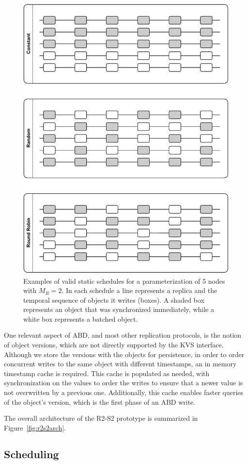 \begin{figure}[ht!]
    \centering
    \includegraphics[width=0.75\linewidth]{img/schedules}
    \caption{Examples of valid static schedules for a
    parameterization of 5 nodes with $M_R = 2$. In each
    schedule a line represents a replica and the temporal sequence of
    objects it writes (boxes). A shaded box represents an object
    that was synchronized immediately, while a white box
    represents a batched object.}\label{fig:schedules}
\end{figure}
One relevant aspect of \ac{ABD}, and most other replication
protocols, is the notion of object versions, which are not directly supported by the
\ac{KVS} interface. Although we store the versions with the
objects for persistence, in order to order concurrent writes to the same object with
different timestamps, an in memory timestamp cache is required. This
cache is populated as needed, with synchronization on the values
to order the writes to ensure that a newer value is not
overwritten by a previous one. Additionally, this cache enables
faster queries of the object's version, which is the first phase
of an \ac{ABD} write.

The overall architecture of the \ac{R2-S2} prototype is
summarized in Figure~\ref{fig:r2s2arch}.

\subsection{Scheduling}\label{ssec:schedule}

